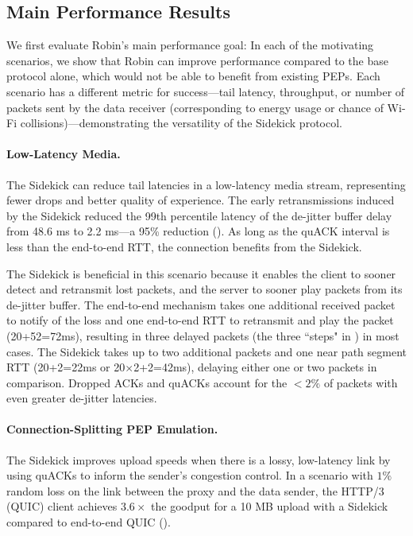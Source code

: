 \subsection{Main Performance Results}
\label{sec:sidekick:evaluation:main-results}

We first evaluate Robin's main performance goal: In each of the motivating
scenarios, we show that Robin can improve performance compared to the base
protocol alone, which would not be able to benefit from existing PEPs.
Each scenario has a different metric for success---tail latency, throughput,
or number of packets sent by the data receiver (corresponding to energy usage
or chance of Wi-Fi collisions)---demonstrating the versatility of the Sidekick
protocol.

\paragraph{Low-Latency Media.}
The Sidekick can reduce tail latencies in a low-latency media stream, representing
fewer drops and better quality of experience.
The early retransmissions induced by the Sidekick reduced the 99th percentile
latency of the de-jitter buffer delay from 48.6 ms to 2.2 ms---a 95\%
reduction ().
As long as the quACK interval is less than the end-to-end RTT, the connection
benefits from the Sidekick.

The Sidekick is beneficial in this scenario because it enables the client to sooner
detect and retransmit lost packets, and the server to sooner play packets from
its de-jitter buffer.
The end-to-end mechanism takes one additional received packet to notify of the
loss and
one end-to-end RTT to retransmit and play the packet (20+52=72ms), resulting in
three delayed packets (the three ``steps" in ) in most cases.
The Sidekick takes up to two additional packets and one near path segment RTT
(20+2=22ms or 20$\times$2+2=42ms), delaying either one or two packets in comparison.
Dropped ACKs and quACKs account for the $<2\%$ of packets with even greater
de-jitter latencies.

\paragraph{Connection-Splitting PEP Emulation.}
The Sidekick improves upload speeds when there is a lossy, low-latency link
by using quACKs to inform the sender's congestion control.
In a scenario with $1\%$ random loss on the link between the proxy and the
data sender, the HTTP/3 (QUIC) client achieves $3.6\times$ the goodput for a 10 MB
upload with a Sidekick compared to end-to-end QUIC ().


